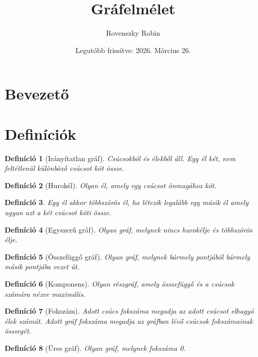 \documentclass{article}
\title{Gráfelmélet}
\author{Rovenszky Robin}
\date{Legutóbb frissítve: 2026. Március 26.}
\newtheorem{definition}{Definíció}
\begin{document}
\maketitle
\tableofcontents
\newpage

\section{Bevezető}

\section{Definíciók}
\begin{definition}[Irányítatlan gráf]
    Csúcsokból és élekből áll. Egy él két, nem feltétlenül különböző csúcsot köt össze.
\end{definition}

\begin{definition}[Hurokél]
    Olyan él, amely egy csúcsot önmagához köt.
\end{definition}

\begin{definition}
    Egy él akkor többszörös él, ha létezik legalább egy másik él amely ugyan azt a két csúcsot köti össze.
\end{definition}

\begin{definition}[Egyszerű gráf]
    Olyan gráf, melynek nincs hurokélje és többszörös élje.
\end{definition}

\begin{definition}[Összefüggő gráf]
    Olyan gráf, melynek bármely pontjából bármely másik pontjába vezet út.
\end{definition}

\begin{definition}[Komponens]
    Olyan részgráf, amely összefüggő és a csúcsok számára nézve maximális.
\end{definition}

\begin{definition}[Fokszám]
    Adott csúcs fokszáma megadja az adott csúcsot elhagyó élek számát. Adott gráf fokszáma megadja az gráfban lévő csúcsok fokszámainak összegét.
\end{definition}

\begin{definition}[Üres gráf]
    Olyan gráf, melynek fokszáma 0.
\end{definition}
\end{document}
